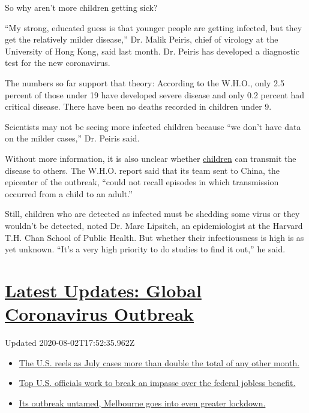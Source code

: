 So why aren't more children getting sick?

``My strong, educated guess is that younger people are getting infected,
but they get the relatively milder disease,'' Dr. Malik Peiris, chief of
virology at the University of Hong Kong, said last month. Dr. Peiris has
developed a diagnostic test for the new coronavirus.

The numbers so far support that theory: According to the W.H.O., only
2.5 percent of those under 19 have developed severe disease and only 0.2
percent had critical disease. There have been no deaths recorded in
children under 9.

Scientists may not be seeing more infected children because ``we don't
have data on the milder cases,'' Dr. Peiris said.

Without more information, it is also unclear whether
\href{https://www.nytimes.com/2020/05/11/health/coronavirus-children-icu.html}{children}
can transmit the disease to others. The W.H.O. report said that its team
sent to China, the epicenter of the outbreak, ``could not recall
episodes in which transmission occurred from a child to an adult.''

Still, children who are detected as infected must be shedding some virus
or they wouldn't be detected, noted Dr. Marc Lipsitch, an epidemiologist
at the Harvard T.H. Chan School of Public Health. But whether their
infectiousness is high is as yet unknown. ``It's a very high priority to
do studies to find it out,'' he said.

\hypertarget{latest-updates-global-coronavirus-outbreak}{%
\section{\texorpdfstring{\href{https://www.nytimes.com/2020/08/01/world/coronavirus-covid-19.html?action=click\&pgtype=Article\&state=default\&region=MAIN_CONTENT_1\&context=storylines_live_updates}{Latest
Updates: Global Coronavirus
Outbreak}}{Latest Updates: Global Coronavirus Outbreak}}\label{latest-updates-global-coronavirus-outbreak}}

Updated 2020-08-02T17:52:35.962Z

\begin{itemize}
\tightlist
\item
  \href{https://www.nytimes.com/2020/08/01/world/coronavirus-covid-19.html?action=click\&pgtype=Article\&state=default\&region=MAIN_CONTENT_1\&context=storylines_live_updates\#link-34047410}{The
  U.S. reels as July cases more than double the total of any other
  month.}
\item
  \href{https://www.nytimes.com/2020/08/01/world/coronavirus-covid-19.html?action=click\&pgtype=Article\&state=default\&region=MAIN_CONTENT_1\&context=storylines_live_updates\#link-780ec966}{Top
  U.S. officials work to break an impasse over the federal jobless
  benefit.}
\item
  \href{https://www.nytimes.com/2020/08/01/world/coronavirus-covid-19.html?action=click\&pgtype=Article\&state=default\&region=MAIN_CONTENT_1\&context=storylines_live_updates\#link-2bc8948}{Its
  outbreak untamed, Melbourne goes into even greater lockdown.}
\end{itemize}


